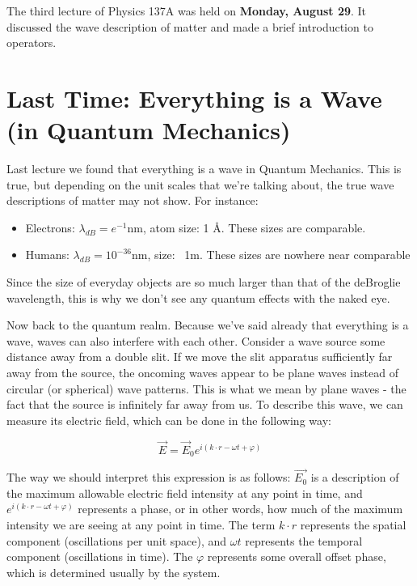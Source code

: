 The third lecture of Physics 137A was held on  \textbf{Monday, August 29}. It discussed the wave description of matter and made a brief introduction to operators.

      \section{Last Time: Everything is a Wave (in Quantum Mechanics)}
          Last lecture we found that everything is a wave in Quantum Mechanics. This is true, but depending on the unit scales that we're talking about, the true wave descriptions of matter may not show. For instance: \

          \begin{itemize}
              \item Electrons: $\lambda_{dB} = e^{-1} \text{nm}$, atom size: 1 \AA. These sizes are comparable.
              \item Humans: $\lambda_{dB} = 10^{-36} \text{nm}$, size: ~1m. These sizes are nowhere near comparable
          \end{itemize}

          Since the size of everyday objects are so much larger than that of the deBroglie wavelength, this is why we don't see any quantum effects with the naked eye.

          Now back to the quantum realm. Because we've said already that everything is a wave, waves can also interfere with each other. Consider a wave source some distance away from a double slit. If we move the slit apparatus sufficiently far away from the source, the oncoming waves appear to be plane waves instead of circular (or spherical) wave patterns. This is what we mean by plane waves - the fact that the source is infinitely far away from us. To describe this wave, we can measure its electric field, which can be done in the following way:

          \[ \vec E = \vec{E}_0e^{i(k \cdot r - \omega t + \varphi)}\]

          The way we should interpret this expression is as follows: $\vec{E_0}$ is a description of the maximum allowable electric field intensity at any point in time, and $e^{i(k \cdot r - \omega t + \varphi)}$ represents a phase, or in other words, how much of the maximum intensity we are seeing at any point in time. The term $k \cdot r$ represents the spatial component (oscillations per unit space), and $\omega t$ represents the temporal component (oscillations in time). The $\varphi$ represents some overall offset phase, which is determined usually by the system.

